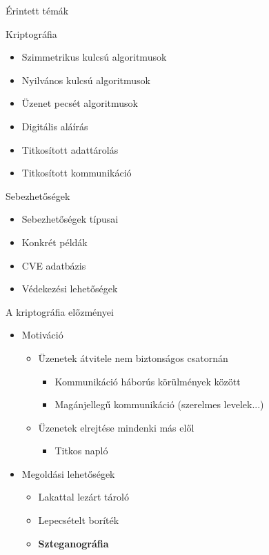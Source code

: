 \documentclass[12 pt]{beamer}
\begin{document}

\begin{frame}{Érintett témák}
  \begin{block}{Kriptográfia}
    \begin{itemize}
      \item{Szimmetrikus kulcsú algoritmusok}
      \item{Nyilvános kulcsú algoritmusok}
      \item{Üzenet pecsét algoritmusok}
      \item{Digitális aláírás}
      \item{Titkosított adattárolás}
      \item{Titkosított kommunikáció}
    \end{itemize}
  \end{block}

  \begin{block}{Sebezhetőségek}
    \begin{itemize}
      \item{Sebezhetőségek típusai}
      \item{Konkrét példák}
      \item{CVE adatbázis}
      \item{Védekezési lehetőségek}
    \end{itemize}
  \end{block}
\end{frame}


\begin{frame}{A kriptográfia előzményei}
  \begin{itemize}
    \item{Motiváció}
      \begin{itemize}
        \item{Üzenetek átvitele nem biztonságos csatornán}
          \begin{itemize}
            \item{Kommunikáció háborús körülmények között}
            \item{Magánjellegű kommunikáció (szerelmes levelek...)}
          \end{itemize}
        \item{Üzenetek elrejtése mindenki más elől}
          \begin{itemize}
            \item{Titkos napló}
          \end{itemize}
      \end{itemize}

    \item{Megoldási lehetőségek}
      \begin{itemize}
        \item{Lakattal lezárt tároló}
        \item{Lepecsételt boríték}
        \item{\textbf{Szteganográfia}}
      \end{itemize}
  \end{itemize}
\end{frame}
\end{document}
